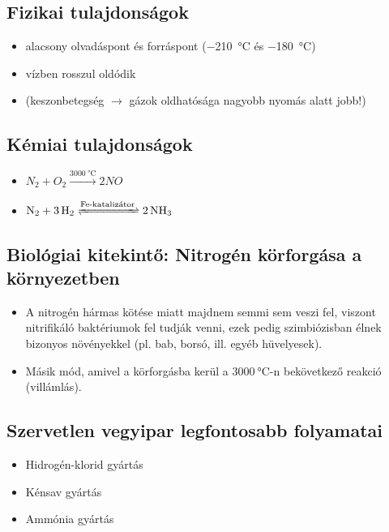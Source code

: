 \documentclass{article}
\begin{document}
\subsection{Fizikai tulajdonságok}
\begin{itemize}
    \item alacsony olvadáspont és forráspont (\SI{-210}{\degreeCelsius} és \SI{-180}{\degreeCelsius})
    \item vízben rosszul oldódik
\end{itemize}

\begin{itemize}
    \item (keszonbetegség $\rightarrow$ gázok oldhatósága nagyobb nyomás alatt jobb!)
\end{itemize}

\subsection{Kémiai tulajdonságok}
\begin{itemize}
    \item $N_2 + O_2 \xrightarrow{\SI{3000}{\degreeCelsius}} 2NO$
    \item \(\ce{N2 + 3 H2 <=>[\text{Fe-katalizátor}] 2 NH3}\)
\end{itemize}

\subsection{Biológiai kitekintő: Nitrogén körforgása a környezetben}
\begin{itemize}
    \item A nitrogén hármas kötése miatt majdnem semmi sem veszi fel, viszont nitrifikáló baktériumok fel tudják venni, ezek pedig szimbiózisban élnek bizonyos növényekkel (pl. bab, borsó, ill. egyéb hüvelyesek).
    \item Másik mód, amivel a körforgásba kerül a $\SI{3000}{\degreeCelsius}$-n bekövetkező reakció (villámlás).
\end{itemize}

\subsection{Szervetlen vegyipar legfontosabb folyamatai}
\begin{itemize}
    \item Hidrogén-klorid gyártás
    \item Kénsav gyártás
    \item Ammónia gyártás
\end{itemize}
\end{document}
